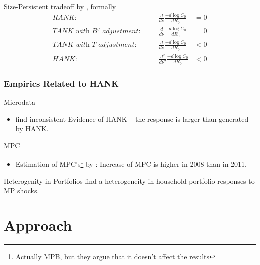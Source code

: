 \documentclass[11pt,pdf,aspectratio=129]{beamer}
\begin{document}
\begin{frame}{Size-Persistent tradeoff by \citet{KMV2018}, formally}
    \begin{align}
        \textit{RANK:}&\quad& \frac{d}{d\nu}\frac{-d\log C_0}{dR_0}&=0     \label{eq:SizePersistenceRANK}\\
    \textit{TANK with $B^g$ adjustment:}&\quad& \frac{d}{d\nu}\frac{-d\log C_0}{dR_0}&= 0     \label{eq:SizePersistenceTANK_B}\\
    \textit{TANK with $T$ adjustment:}&\quad& \frac{d}{d\nu}\frac{-d\log C_0}{dR_0}&< 0     \label{eq:SizePersistenceTANK_T}\\
    \textit{HANK:}& \quad& 
        \frac{d^2}{d\nu ^2}\frac{-d\log C_0}{dR_0}&<0
        \label{eq:SizePersistenceHANK}
    \end{align}
    
\end{frame}


\begin{frame}\frametitle{Empirics Related to HANK}

\begin{block}{Microdata}
    \begin{itemize}
        \item \citet{HolmBlomhoff2021} find inconsistent Evidence of HANK -- the response is larger than generated by HANK.
    \end{itemize}
\end{block}
\begin{block}{MPC}
    \begin{itemize}
        \item  Estimation of MPC's\footnote{Actually MPB, but they argue that it doesn't affect the results} by \citet{Gross2020}:
        Increase of MPC is higher in 2008 than in 2011.
    \end{itemize}
\end{block}
\begin{block}{Heterogenity in Portfolios}
    \citet{Luetticke2021} find a heterogeneity in household portfolio responses to MP shocks.
\end{block}
\end{frame}


\section{Approach}
\end{document}
